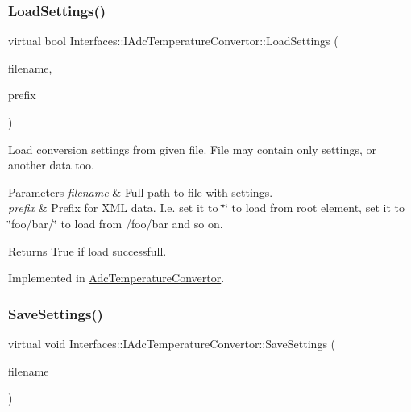 \subsubsection{\texorpdfstring{Load\+Settings()}{LoadSettings()}}
{\footnotesize\ttfamily virtual bool Interfaces\+::\+I\+Adc\+Temperature\+Convertor\+::\+Load\+Settings (\begin{DoxyParamCaption}\item[{Q\+String}]{filename,  }\item[{Q\+String}]{prefix }\end{DoxyParamCaption})\hspace{0.3cm}{\ttfamily [pure virtual]}}



Load conversion settings from given file. File may contain only settings, or another data too. 


\begin{DoxyParams}{Parameters}
{\em filename} & Full path to file with settings. \\
\hline
{\em prefix} & Prefix for X\+ML data. I.\+e. set it to \char`\"{}\char`\"{} to load from root element, set it to \char`\"{}foo/bar/\char`\"{} to load from /foo/bar and so on. \\
\hline
\end{DoxyParams}
\begin{DoxyReturn}{Returns}
True if load successfull. 
\end{DoxyReturn}


Implemented in \hyperlink{class_adc_temperature_convertor_ac45f10e678aa2f9e25c5351dfd283de0}{Adc\+Temperature\+Convertor}.

\mbox{\label{class_interfaces_1_1_i_adc_temperature_convertor_a6631e979e067ab78d3e5c337449876ac}} 
\subsubsection{\texorpdfstring{Save\+Settings()}{SaveSettings()}}
{\footnotesize\ttfamily virtual void Interfaces\+::\+I\+Adc\+Temperature\+Convertor\+::\+Save\+Settings (\begin{DoxyParamCaption}\item[{Q\+String}]{filename }\end{DoxyParamCaption})\hspace{0.3cm}{\ttfamily [pure virtual]}}



